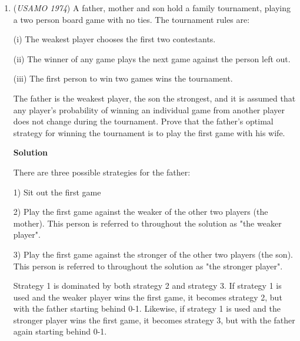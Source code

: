 \begin{enumerate}
 Assume the contrary and suppose that the curve intersects $Q$ at point C. Reflect the portion of the curve from C to B to obtain a same-length curve from C to B'. Then the length of the curve equals the length of the new curve from A to B', which is at least the distance from A to B', or 2. This is a contradiction to the claim that the length of the curve is less than 2, so the curve must be contained in the hemisphere divided by $Q$ containing points A and B.

 <i>Alternate solutions are always welcome. If you have a different, elegant solution to this problem, please \href{https://artofproblemsolving.com/wiki/index.php?title=1974\_USAMO\_Problems/Problem\_3&action=edit}{add it} to this page.</i>



	\item (\textit{USAMO 1974}) A father, mother and son hold a family tournament, playing a two person board game with no ties. The tournament rules are:


 (i) The weakest player chooses the first two contestants.


 (ii) The winner of any game plays the next game against the person left out.


 (iii) The first person to win two games wins the tournament.


 The father is the weakest player, the son the strongest, and it is assumed that any player's probability of winning an individual game from another player does not change during the tournament. Prove that the father's optimal strategy for winning the tournament is to play the first game with his wife.


 



\textbf{Solution}

There are three possible strategies for the father:

 1)  Sit out the first game

 2)  Play the first game against the weaker of the other two players (the mother).  This person is referred to throughout the solution as "the weaker player".

 3)  Play the first game against the stronger of the other two players (the son).  This person is referred to throughout the solution as "the stronger player".

 
Strategy 1 is dominated by both strategy 2 and strategy 3.  If strategy 1 is used and the weaker player wins the first game, it becomes strategy 2, but with the father starting behind 0-1.  Likewise, if strategy 1 is used and the stronger player wins the first game, it becomes strategy 3, but with the father again starting behind 0-1.


\end{enumerate}
